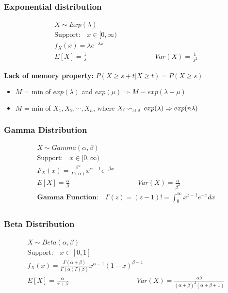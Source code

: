 \subsubsection*{Exponential distribution}
\begin{tcolorbox}
\begin{gather*}
	X \sim Exp(\lambda)\\
	\text{Support:} \quad x \in [0, \infty)\\
	f_X(x) = \lambda e^{-\lambda x}\\
	E[X] = \frac{1}{\lambda} \hspace{10em} Var(X) = \frac{1}{\lambda^2}
\end{gather*}	
\end{tcolorbox}

\textbf{Lack of memory property:} $P(X \geq s+t | X\geq t) = P(X \geq s)$
\begin{itemize}
	\item $M$ = min of $exp(\lambda)$ and $exp(\mu) \Rightarrow M \backsim exp(\lambda + \mu)$
	\item $M$ = min of $X_1, X_2, \cdots, X_n$, where $X_i \backsim_{\text{\tiny i.i.d.}} exp(\lambda) \Rightarrow exp(n\lambda)$ 
\end{itemize}
\subsubsection*{Gamma Distribution}
\begin{tcolorbox}
	\begin{gather*}
		X \sim Gamma(\alpha, \beta)\\
		\text{Support:} \quad x \in [0, \infty)\\
		F_X(x) = \frac{\beta^\alpha}{\Gamma(\alpha)} x^{\alpha - 1} e^{-\beta x}\\
		E[X] = \frac{\alpha}{\beta} \hspace{10em} Var(X) = \frac{\alpha}{\beta^2}\\
		\textbf{Gamma Function:} \quad \Gamma(z) = (z - 1)! = \int_0^\infty x^{z-1} e^{-x} dx\\
	\end{gather*}
\end{tcolorbox}
\subsubsection*{Beta Distribution}
\begin{tcolorbox}
\begin{gather*}
	X \sim Beta(\alpha, \beta)\\
	\text{Support:} \quad x \in [0, 1]\\
	f_X(x) = \frac{\Gamma(\alpha + \beta)}{\Gamma(\alpha) \Gamma(\beta)} x^{\alpha - 1} (1 - x)^{\beta - 1}\\
	E[X] = \frac{\alpha}{\alpha + \beta} \hspace{10em} Var(X) = \frac{\alpha \beta}{(\alpha + \beta)^2(\alpha + \beta + 1)}
\end{gather*}	
\end{tcolorbox}

